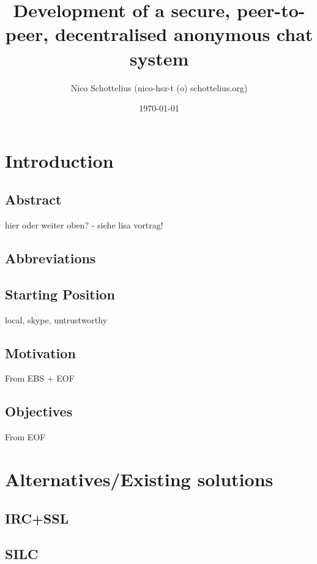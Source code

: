 \documentclass[12pt,a4paper]{article}
\begin{document}
\title{Development of a secure, peer-to-peer, decentralised anonymous chat system}
\date{\today}
\author{Nico Schottelius (nico-hsz-t (o) schottelius.org)}
\maketitle
\newpage
\tableofcontents
\listoftables
\newpage

\section{Introduction}
\subsection{Abstract}
hier oder weiter oben? - siehe lisa vortrag!

\subsection{Abbreviations}
\subsection{Starting Position}
local, skype, untrustworthy

\subsection{Motivation}
From EBS + EOF

\subsection{Objectives}
From EOF

\section{Alternatives/Existing solutions}
\subsection{IRC+SSL}
\subsection{SILC}
\end{document}
